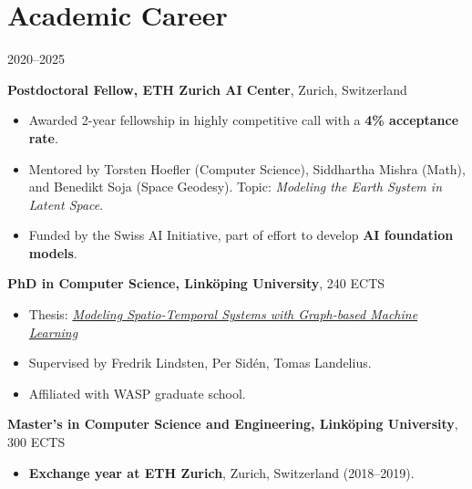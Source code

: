 \documentclass[11pt]{article}
\begin{document}
\section*{Academic Career}
\begin{labeling}{2020--2025}
    \item [2025 --] \textbf{Postdoctoral Fellow, ETH Zurich AI Center}, Zurich, Switzerland
        \begin{itemize}
            \item Awarded 2-year fellowship in highly competitive call with a \textbf{4\% acceptance rate}.
            \item Mentored by Torsten Hoefler (Computer Science), Siddhartha Mishra (Math), and Benedikt Soja (Space Geodesy).
            Topic: \textit{Modeling the Earth System in Latent Space}.
            \item Funded by the Swiss AI Initiative, part of effort to develop \textbf{AI foundation models}.
        \end{itemize}
    \item [2020--2025] \textbf{PhD in Computer Science, Linköping University}, 240 ECTS
        \begin{itemize}
            \item Thesis: \href{https://urn.kb.se/resolve?urn=urn:nbn:se:liu:diva-215665}{\textit{Modeling Spatio-Temporal Systems with Graph-based Machine Learning}}
            \item Supervised by Fredrik Lindsten, Per Sidén, Tomas Landelius. 
            \item Affiliated with WASP graduate school.
        \end{itemize}
    \item [2015--2020] \textbf{Master's in Computer Science and Engineering, Linköping University}, 300 ECTS
        \begin{itemize}
            \item \textbf{Exchange year at ETH Zurich}, Zurich, Switzerland (2018--2019).
        \end{itemize}
\end{labeling}
\end{document}
